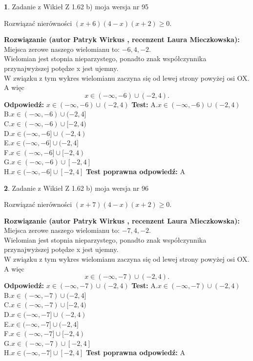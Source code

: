 \documentclass[12pt, a4paper]{article}
\theoremstyle{definition} %
\newtheorem{zad}{}
\newcommand{\zadStart}[1]{\begin{zad}#1\newline}
\newcommand{\zadStop}{\end{zad}}
\newcommand{\rozwStart}[2]{\noindent \textbf{Rozwiązanie (autor #1 , recenzent #2): }\newline}
\newcommand{\rozwStop}{\newline}
\newcommand{\odpStart}{\noindent \textbf{Odpowiedź:}\newline}
\newcommand{\odpStop}{\newline}
\newcommand{\testStart}{\noindent \textbf{Test:}\newline}
\newcommand{\testStop}{\newline}
\newcommand{\kluczStart}{\noindent \textbf{Test poprawna odpowiedź:}\newline}
\newcommand{\kluczStop}{\newline}
\begin{document}
\zadStart{Zadanie z Wikieł Z 1.62 b) moja wersja nr 95}

Rozwiązać nierówności $(x+6)(4-x)(x+2)\ge0$.
\zadStop
\rozwStart{Patryk Wirkus}{Laura Mieczkowska}
Miejsca zerowe naszego wielomianu to: $-6, 4, -2$.\\
Wielomian jest stopnia nieparzystego, ponadto znak współczynnika przy\linebreak najwyższej potędze x jest ujemny.\\ W związku z tym wykres wielomianu zaczyna się od lewej strony powyżej osi OX. A więc $$x \in (-\infty,-6) \cup (-2,4).$$
\rozwStop
\odpStart
$x \in (-\infty,-6) \cup (-2,4)$
\odpStop
\testStart
A.$x \in (-\infty,-6) \cup (-2,4)$\\
B.$x \in (-\infty,-6) \cup (-2,4]$\\
C.$x \in (-\infty,-6) \cup [-2,4)$\\
D.$x \in (-\infty,-6] \cup (-2,4)$\\
E.$x \in (-\infty,-6] \cup (-2,4]$\\
F.$x \in (-\infty,-6] \cup [-2,4)$\\
G.$x \in (-\infty,-6) \cup [-2,4]$\\
H.$x \in (-\infty,-6] \cup [-2,4]$
\testStop
\kluczStart
A
\kluczStop



\zadStart{Zadanie z Wikieł Z 1.62 b) moja wersja nr 96}

Rozwiązać nierówności $(x+7)(4-x)(x+2)\ge0$.
\zadStop
\rozwStart{Patryk Wirkus}{Laura Mieczkowska}
Miejsca zerowe naszego wielomianu to: $-7, 4, -2$.\\
Wielomian jest stopnia nieparzystego, ponadto znak współczynnika przy\linebreak najwyższej potędze x jest ujemny.\\ W związku z tym wykres wielomianu zaczyna się od lewej strony powyżej osi OX. A więc $$x \in (-\infty,-7) \cup (-2,4).$$
\rozwStop
\odpStart
$x \in (-\infty,-7) \cup (-2,4)$
\odpStop
\testStart
A.$x \in (-\infty,-7) \cup (-2,4)$\\
B.$x \in (-\infty,-7) \cup (-2,4]$\\
C.$x \in (-\infty,-7) \cup [-2,4)$\\
D.$x \in (-\infty,-7] \cup (-2,4)$\\
E.$x \in (-\infty,-7] \cup (-2,4]$\\
F.$x \in (-\infty,-7] \cup [-2,4)$\\
G.$x \in (-\infty,-7) \cup [-2,4]$\\
H.$x \in (-\infty,-7] \cup [-2,4]$
\testStop
\kluczStart
A
\kluczStop
\end{document}
